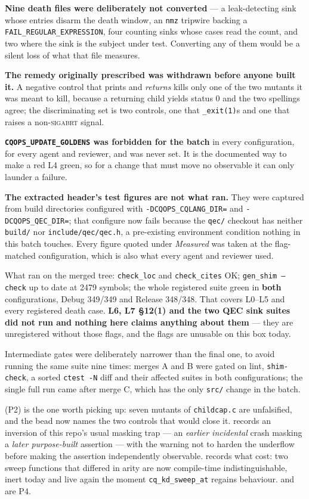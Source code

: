 \textbf{Nine death files were deliberately not converted} --- a leak-detecting sink whose entries
disarm the death window, an \texttt{nmz} tripwire backing a \texttt{FAIL\_REGULAR\_EXPRESSION},
four counting sinks whose cases read the count, and two where the sink is the subject under test.
Converting any of them would be a silent loss of what that file measures.

\textbf{The remedy  originally prescribed was withdrawn before anyone built it.} A
negative control that prints and \emph{returns} kills only one of the two mutants it was meant to
kill, because a returning child yields status 0 and the two spellings agree; the discriminating set
is two controls, one that \texttt{\_exit(1)}s and one that raises a non-\textsc{sigabrt} signal.

\textbf{\texttt{CQOPS\_UPDATE\_GOLDENS} was forbidden for the batch} in every configuration, for
every agent and reviewer, and was never set. It is the documented way to make a red L4 green, so
for a change that must move no observable it can only launder a failure.


\textbf{The extracted header's test figures are not what ran.} They were
captured from build directories configured with \texttt{-DCQOPS\_CQLANG\_DIR=} and
\texttt{-DCQOPS\_QEC\_DIR=}; that configure now fails because the \texttt{qec/} checkout has neither
\texttt{build/} nor \texttt{include/qec/qec.h}, a pre-existing environment condition nothing in this
batch touches. Every figure quoted under \emph{Measured} was taken at the flag-matched
configuration, which is also what every agent and reviewer used.

What ran on the merged tree: \texttt{check\_loc} and \texttt{check\_cites} OK; \texttt{gen\_shim
--check} up to date at 2479 symbols; the whole registered suite green in \textbf{both}
configurations, Debug 349/349 and Release 348/348. That covers L0--L5 and every registered death
case. \textbf{L6, L7 \S12(1) and the two QEC sink suites did not run and nothing here claims
anything about them} --- they are unregistered without those flags, and the flags are unusable on
this box today.

Intermediate gates were deliberately narrower than the final one, to avoid running the same suite
nine times: merges A and B were gated on lint, \texttt{shim-check}, a sorted \texttt{ctest -N} diff
and their affected suites in both configurations; the single full run came after merge C, which has
the only \texttt{src/} change in the batch.


 (P2) is the one worth picking up: seven mutants of
\texttt{childcap.c} are unfalsified, and the bead now names the two controls that would close it.
 records an inversion of this repo's usual masking trap --- an \emph{earlier incidental}
crash masking a \emph{later purpose-built} assertion --- with the warning not to harden the
underflow before making the assertion independently observable.  records what 
cost: two sweep functions that differed in arity are now compile-time indistinguishable, inert
today and live again the moment \texttt{cq\_kd\_sweep\_at} regains behaviour.  and
 are P4.


